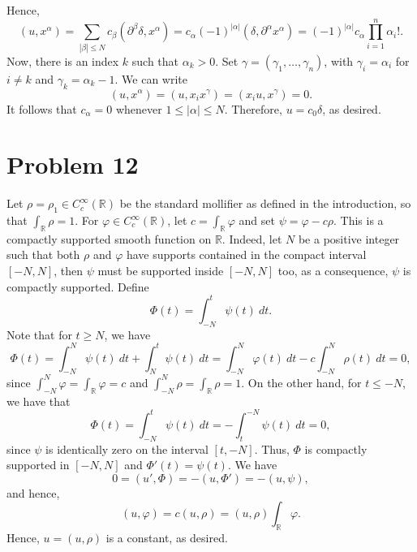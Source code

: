\documentclass[10pt]{amsart}
\theoremstyle{thmstyle}
\theoremstyle{defstyle}
\newcommand{\R}{\mathbb{R}}
\renewcommand{\le}{\leqslant}
\renewcommand{\ge}{\geqslant}
\begin{document}
Hence, 
\begin{equation*}
	(u, x^\alpha) = \sum_{|\beta|\le N} c_\beta\left(\partial^\beta\delta, x^\alpha\right) = c_\alpha(-1)^{|\alpha|}(\delta, \partial^\alpha x^\alpha) = (-1)^{|\alpha|}c_\alpha\prod_{i = 1}^n \alpha_i!.
\end{equation*}
Now, there is an index $k$ such that $\alpha_k > 0$. Set $\gamma = (\gamma_1,\dots,\gamma_n)$, with $\gamma_i = \alpha_i$ for $i\ne k$ and $\gamma_k = \alpha_k - 1$. We can write 
\begin{equation*}
	(u, x^\alpha) = (u, x_i x^\gamma) = (x_iu, x^\gamma) = 0.
\end{equation*}
It follows that $c_\alpha = 0$ whenever $1\le |\alpha|\le N$. Therefore, $u = c_0\delta$, as desired.

\section{Problem 12}

Let $\rho = \rho_1\in C_c^\infty(\R)$ be the standard mollifier as defined in the introduction, so that $\int_\R\rho = 1$. For $\varphi\in C_c^\infty(\R)$, let $c = \int_\R\varphi$ and set $\psi = \varphi - c\rho$. This is a compactly supported smooth function on $\R$. Indeed, let $N$ be a positive integer such that both $\rho$ and $\varphi$ have supports contained in the compact interval $[-N, N]$, then $\psi$ must be supported inside $[-N, N]$ too, as a consequence, $\psi$ is compactly supported. Define
\begin{equation*}
	\Phi(t) = \int_{-N}^t \psi(t)~dt.
\end{equation*}
Note that for $t\ge N$, we have
\begin{equation*}
	\Phi(t) = \int_{-N}^N\psi(t)~dt + \int_{N}^t\psi(t)~dt = \int_{-N}^N\varphi(t)~dt - c\int_{-N}^N \rho(t)~dt = 0,
\end{equation*}
since $\int_{-N}^N\varphi = \int_{\R}\varphi = c$ and $\int_{-N}^{N}\rho = \int_\R\rho = 1$. On the other hand, for $t\le -N$, we have that 
\begin{equation*}
	\Phi(t) = \int_{-N}^t\psi(t)~dt = -\int_{t}^{-N}\psi(t)~dt = 0,
\end{equation*}
since $\psi$ is identically zero on the interval $[t, -N]$. Thus, $\Phi$ is compactly supported in $[-N, N]$ and $\Phi'(t) = \psi(t)$. We have 
\begin{equation*}
	0 = (u', \Phi) = -(u,\Phi') = -(u,\psi),
\end{equation*}
and hence, 
\begin{equation*}
	(u,\varphi) = c(u,\rho) = (u,\rho)\int_{\R}\varphi.
\end{equation*}
Hence, $u = (u,\rho)$ is a constant, as desired.
\end{document}
